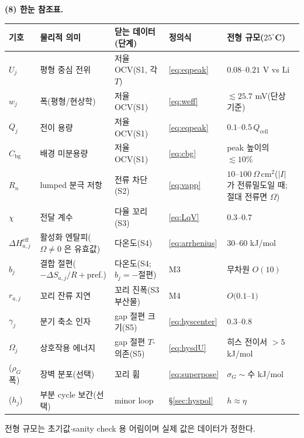 \documentclass[11pt,a4paper]{article}
\newcommand{\eff}{\mathrm{eff}}
\newcommand{\cell}{\mathrm{cell}}
\newcommand{\bg}{\mathrm{bg}}
\begin{document}
\textbf{(8) 한눈 참조표.}
\begin{center}
\renewcommand{\arraystretch}{1.3}
\begin{tabular}{p{} p{} p{} p{} p{}}
\toprule
기호 & 물리적 의미 & 닫는 데이터(단계) & 정의식 & 전형 규모($25^\circ$C) \\
\midrule
$U_j$ & 평형 중심 전위 & 저율 OCV(S1, 각 $T$) & \eqref{eq:eqpeak} & $0.08$--$0.21$ V vs Li \\
$w_j$ & 폭(평형/현상학) & 저율 OCV(S1) & \eqref{eq:weff} & $\lesssim25.7$ mV(단상 기준) \\
$Q_j$ & 전이 용량 & 저율 OCV(S1) & \eqref{eq:eqpeak} & $0.1$--$0.5\,Q_\cell$ \\
$C_\bg$ & 배경 미분용량 & 저율 OCV(S1) & \eqref{eq:cbg} & peak 높이의 $\lesssim10\%$ \\
$R_n$ & lumped 분극 저항 & 전류 차단(S2) & \eqref{eq:vapp} & $10$--$100\ \Omega\,$cm$^2$($|I|$ 가 전류밀도일 때; 절대 전류면 $\Omega$) \\
$\chi$ & 전달 계수 & 다율 꼬리(S3) & \eqref{eq:LqV} & $0.3$--$0.7$ \\
$\Delta H_{a,j}^{\eff}$ & 활성화 엔탈피($\Omega\ne0$ 은 유효값) & 다온도(S4) & \eqref{eq:arrhenius} & $30$--$60$ kJ/mol \\
$b_j$ & 결합 절편($-\Delta S_{a,j}/R+$pref.) & 다온도(S4; $b_j=-$절편) & M3 & 무차원 $O(10)$ \\
$r_{a,j}$ & 꼬리 잔류 지연 & 꼬리 진폭(S3 부산물) & M4 & $O(0.1$--$1)$ \\
$\gamma_j$ & 분기 축소 인자 & gap 절편 크기(S5) & \eqref{eq:hyscenter} & $0.3$--$0.8$ \\
$\Omega_j$ & 상호작용 에너지 & gap 절편 $T$-의존(S5) & \eqref{eq:hysdU} & 히스 전이서 $>5$ kJ/mol \\
($\rho_G$ 폭) & 장벽 분포(선택) & 꼬리 휨 & \eqref{eq:superpose} & $\sigma_G\sim$수 kJ/mol \\
($h_j$) & 부분 cycle 보간(선택) & minor loop & \S\ref{sec:hyspol} & $h\approx\eta$ \\
\bottomrule
\end{tabular}
\end{center}
전형 규모는 초기값$\cdot$sanity check 용 어림이며 실제 값은 데이터가 정한다.
\end{document}

